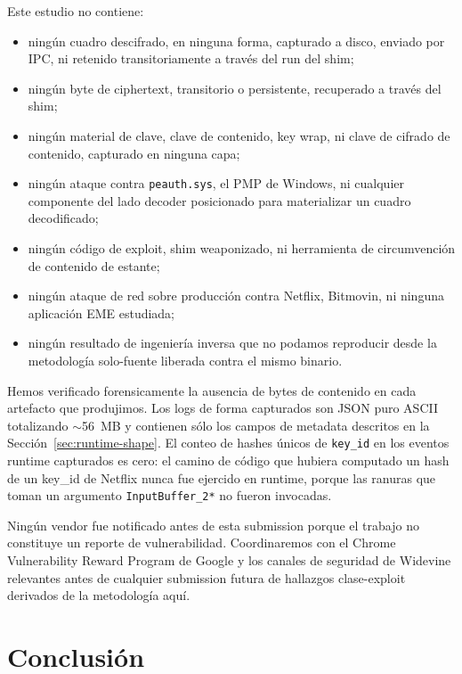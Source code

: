 \documentclass[11pt,letterpaper]{article}
\let\oldsection\section
\renewcommand{\section}{\clearpage\oldsection}
\begin{document}
Este estudio no contiene:
\begin{itemize}[itemsep=1pt,topsep=2pt]
\item ningún cuadro descifrado, en ninguna forma, capturado a
      disco, enviado por IPC, ni retenido transitoriamente a
      través del run del shim;
\item ningún byte de ciphertext, transitorio o persistente,
      recuperado a través del shim;
\item ningún material de clave, clave de contenido, key wrap, ni
      clave de cifrado de contenido, capturado en ninguna capa;
\item ningún ataque contra \texttt{peauth.sys}, el PMP de
      Windows, ni cualquier componente del lado decoder
      posicionado para materializar un cuadro decodificado;
\item ningún código de exploit, shim weaponizado, ni herramienta
      de circumvención de contenido de estante;
\item ningún ataque de red sobre producción contra Netflix,
      Bitmovin, ni ninguna aplicación EME estudiada;
\item ningún resultado de ingeniería inversa que no podamos
      reproducir desde la metodología solo-fuente liberada
      contra el mismo binario.
\end{itemize}

Hemos verificado forensicamente la ausencia de bytes de contenido
en cada artefacto que produjimos. Los logs de forma capturados
son JSON puro ASCII totalizando $\sim$56~MB y contienen sólo los
campos de metadata descritos en la
Sección~\ref{sec:runtime-shape}. El conteo de hashes únicos de
\texttt{key\_id} en los eventos runtime capturados es cero: el
camino de código que hubiera computado un hash de un key\_id de
Netflix nunca fue ejercido en runtime, porque las ranuras que
toman un argumento \texttt{InputBuffer\_2*} no fueron invocadas.

Ningún vendor fue notificado antes de esta submission porque el
trabajo no constituye un reporte de vulnerabilidad. Coordinaremos
con el Chrome Vulnerability Reward Program de Google y los
canales de seguridad de Widevine relevantes antes de cualquier
submission futura de hallazgos clase-exploit derivados de la
metodología aquí.

\section{Conclusión}
\label{sec:conclusion}
\end{document}
